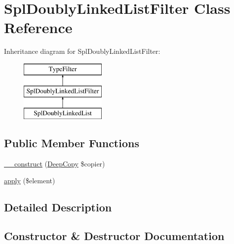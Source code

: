 \hypertarget{class_deep_copy_1_1_type_filter_1_1_spl_1_1_spl_doubly_linked_list_filter}{}\section{Spl\+Doubly\+Linked\+List\+Filter Class Reference}
\label{class_deep_copy_1_1_type_filter_1_1_spl_1_1_spl_doubly_linked_list_filter}
Inheritance diagram for Spl\+Doubly\+Linked\+List\+Filter\+:\begin{figure}[H]
\begin{center}
\leavevmode
\includegraphics[height=3.000000cm]{class_deep_copy_1_1_type_filter_1_1_spl_1_1_spl_doubly_linked_list_filter}
\end{center}
\end{figure}
\subsection*{Public Member Functions}
\begin{DoxyCompactItemize}
\item 
\mbox{\hyperlink{class_deep_copy_1_1_type_filter_1_1_spl_1_1_spl_doubly_linked_list_filter_a1680d0aedad97621caa24801635425fc}{\+\_\+\+\_\+construct}} (\mbox{\hyperlink{class_deep_copy_1_1_deep_copy}{Deep\+Copy}} \$copier)
\item 
\mbox{\hyperlink{class_deep_copy_1_1_type_filter_1_1_spl_1_1_spl_doubly_linked_list_filter_a959e75f8f2b305dcf33633745c338176}{apply}} (\$element)
\end{DoxyCompactItemize}


\subsection{Detailed Description}


\subsection{Constructor \& Destructor Documentation}
\mbox{\label{class_deep_copy_1_1_type_filter_1_1_spl_1_1_spl_doubly_linked_list_filter_a1680d0aedad97621caa24801635425fc}} 
